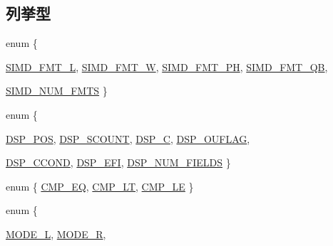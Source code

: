 \subsection*{列挙型}
\begin{DoxyCompactItemize}
\item 
enum \{ \par
\hyperlink{namespaceMipsISA_abc5c98fcc1211af2b80116dd6e0a035dabc5db6a7905a06b9ef7dac8f5a1ceb57}{SIMD\_\-FMT\_\-L}, 
\hyperlink{namespaceMipsISA_abc5c98fcc1211af2b80116dd6e0a035daaf3817deece40f38ee136ea035cdfa65}{SIMD\_\-FMT\_\-W}, 
\hyperlink{namespaceMipsISA_abc5c98fcc1211af2b80116dd6e0a035da121fe6c797f84b036a02c50d5a1086f4}{SIMD\_\-FMT\_\-PH}, 
\hyperlink{namespaceMipsISA_abc5c98fcc1211af2b80116dd6e0a035daa9e20efc4e0454d109d83b13e1ff24d9}{SIMD\_\-FMT\_\-QB}, 
\par
\hyperlink{namespaceMipsISA_abc5c98fcc1211af2b80116dd6e0a035da7711d6a94d621f0465c95e9c4072a313}{SIMD\_\-NUM\_\-FMTS}
 \}
\item 
enum \{ \par
\hyperlink{namespaceMipsISA_ac36f475ca5b446f4fde4c9b90bec77c8abec11a30f24069b14b2c57fa4ffa2cb9}{DSP\_\-POS}, 
\hyperlink{namespaceMipsISA_ac36f475ca5b446f4fde4c9b90bec77c8a1e91ee45e01183742aa2f76ac84fa71a}{DSP\_\-SCOUNT}, 
\hyperlink{namespaceMipsISA_ac36f475ca5b446f4fde4c9b90bec77c8a76bc39ce25670a19f38f9b530294fd7c}{DSP\_\-C}, 
\hyperlink{namespaceMipsISA_ac36f475ca5b446f4fde4c9b90bec77c8a7d3666cfe4f21743fbc091810f026f26}{DSP\_\-OUFLAG}, 
\par
\hyperlink{namespaceMipsISA_ac36f475ca5b446f4fde4c9b90bec77c8aea7e469026daf92b20c31db8b3190ace}{DSP\_\-CCOND}, 
\hyperlink{namespaceMipsISA_ac36f475ca5b446f4fde4c9b90bec77c8a20b2e164386631bdf0b2c688e3e3018d}{DSP\_\-EFI}, 
\hyperlink{namespaceMipsISA_ac36f475ca5b446f4fde4c9b90bec77c8ad961a62d560bdaeb4884bdf08c010f24}{DSP\_\-NUM\_\-FIELDS}
 \}
\item 
enum \{ \hyperlink{namespaceMipsISA_a05589fbab0657f08285ebdfe93f5ec9ea426856996bbe8179c8f3dffe724b49c5}{CMP\_\-EQ}, 
\hyperlink{namespaceMipsISA_a05589fbab0657f08285ebdfe93f5ec9eaa19631d0d9130794781397d706758e05}{CMP\_\-LT}, 
\hyperlink{namespaceMipsISA_a05589fbab0657f08285ebdfe93f5ec9ea94ce84b6ac0066e66f24eee6a5022f73}{CMP\_\-LE}
 \}
\item 
enum \{ \par
\hyperlink{namespaceMipsISA_a16af7b253440dadd46a80a4b9fddba4da93f01ca83f3b5e3dc942213a4777857c}{MODE\_\-L}, 
\hyperlink{namespaceMipsISA_a16af7b253440dadd46a80a4b9fddba4da1e03ce070d35567c677bbb57d8c8a64e}{MODE\_\-R}, 

\end{DoxyCompactItemize}
